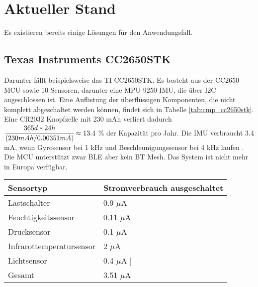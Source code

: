 

\chapter{Aktueller Stand}
Es existieren bereits einige Lösungen für den Anwendungsfall.

\section{Texas Instruments CC2650STK}
Darunter fällt beispielsweise das TI CC2650STK.
Es besteht aus der CC2650 MCU sowie 10 Sensoren, darunter eine MPU-9250 IMU, die über I2C angeschlossen ist.
Eine Auflistung der überflüssigen Komponenten, die nicht komplett abgeschaltet werden können, findet sich in Tabelle \ref{tab:cmp_cc2650stk}.
Eine CR2032 Knopfzelle mit 230 mAh verliert dadurch $\cfrac{365d*24h}{(230mAh/0.00351mA)} \approx 13.4$ \% der Kapazität pro Jahr.
Die IMU verbraucht 3.4 mA, wenn Gyrosensor bei 1 kHz und Beschleunigungssensor bei 4 kHz laufen \cite{datasheet_mpu9250}.
Die MCU unterstützt zwar BLE aber kein BT Mesh.
Das System ist nicht mehr in Europa verfügbar. \cite{site_cc2650stk}

\begin{minipage}{\linewidth}
	\label{tab:cmp_cc2650stk}
	\begin{tabularx}{\linewidth}{X|X}
    Sensortyp & Stromverbrauch ausgeschaltet\\
    \hline
    Lastschalter & 0.9 $\mu$A \cite{datasheet_tps2291}\\
    Feuchtigkeitssensor & 0.11 $\mu$A \cite{datasheet_hdc1000}\\
    Drucksensor & 0.1 $\mu$A \cite{datasheet_bmp280}\\
    Infrarottemperatursensor & 2 $\mu$A \cite{site_tmp007}\\
    Lichtsensor & 0.4 $\mu$A \cite{datasheet_opt3001}]\\
    \hline
    Gesamt & 3.51 $\mu$A\\
  \end{tabularx}
\end{minipage}

